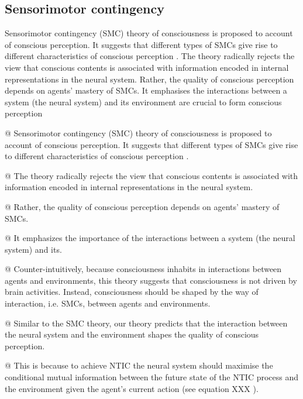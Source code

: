 \documentclass[utf8]{article}
\newenvironment{ants}
			{
			 \begin{easylist}[itemize]
		 	}
			{
			\end{easylist}
			} %
\newcommand{\critical}[1]{%
			\todo[color=OrangeRed!80!white]{#1}
		}
\begin{document}
		\subsection{Sensorimotor contingency}
		Sensorimotor contingency (SMC) theory of consciousness is proposed to account of conscious perception. It suggests that different types of SMCs give rise to different characteristics of conscious perception \cite{o2001sensorimotor}. The theory radically rejects the view that conscious contents is associated with information encoded in internal representations in the neural system. Rather, the quality of conscious perception depends on agents' mastery of SMCs. It emphasises the interactions between a system (the neural system) and its environment are crucial to form conscious perception 
		
		
			\begin{ants}

				@ Sensorimotor contingency (SMC) theory of consciousness is proposed to account of conscious perception. It suggests that different types of SMCs give rise to different characteristics of conscious perception \cite{o2001sensorimotor}.

				@ The theory radically rejects the view that conscious contents is associated with information encoded in internal representations in the neural system.

				@ Rather, the quality of conscious perception depends on agents' mastery of SMCs.

				@ It emphasizes the importance of the interactions between a system (the neural system) and its.

				@ Counter-intuitively, because consciousness inhabits in interactions between agents and environments, this theory suggests that consciousness is not driven by brain activities. Instead, consciousness should be shaped by the way of interaction, i.e. SMCs, between agents and environments.




				@ Similar to the SMC theory, our theory predicts that the interaction between the neural system and the environment shapes the quality of conscious perception.

				@ This is because to achieve NTIC the neural system should maximise the conditional mutual information between the future state of the NTIC process and the environment given the agent's current action (see equation XXX \critical{I NEED A EQUATION!}).


\end{ants}
\end{document}
